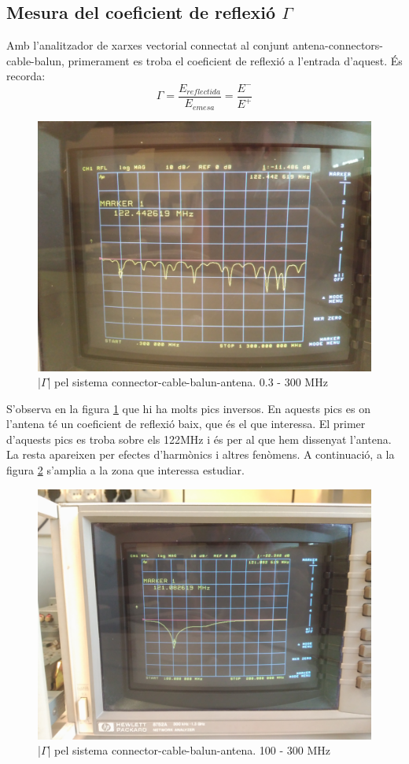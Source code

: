 \subsection{Mesura del coeficient de reflexió $\Gamma$}
Amb l'analitzador de xarxes vectorial connectat al conjunt antena-connectors-cable-balun, primerament es troba el coeficient de reflexió a l'entrada d'aquest. És recorda:
\begin{equation}
\Gamma = \frac{E_{reflectida}}{E_{emesa}} =\frac{E^-}{E^+}
\end{equation}
\begin{figure}[H]
	\centering
	\includegraphics[width=\textwidth]{./images/Mesures/1reflx_broadband.jpg}
	\caption{|$\Gamma$| pel sistema connector-cable-balun-antena. 0.3 - 300 MHz }
	\label{1rflx}
\end{figure}
S'observa en la figura \ref{1rflx} que hi ha molts pics inversos. En aquests pics es on l'antena té un coeficient de reflexió baix, que és el que interessa. El primer d'aquests pics es troba sobre els 122MHz i és per al que hem dissenyat l'antena. La resta apareixen per efectes d'harmònics i altres fenòmens.
A continuació, a la figura \ref{2rflx} s'amplia a la zona que interessa estudiar.
\begin{figure}[H]
	\centering
	\includegraphics[width=\textwidth]{./images/Mesures/2relfx_narrowband.jpg}
	\caption{|$\Gamma$| pel sistema connector-cable-balun-antena. 100 - 300 MHz }
	\label{2rflx}
\end{figure}
